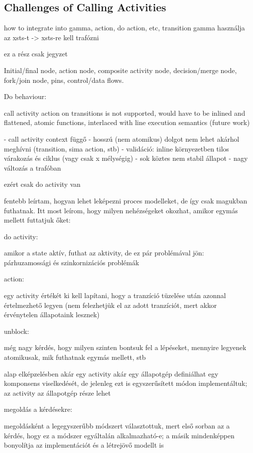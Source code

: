 \subsection{Challenges of Calling Activities}

how to integrate into gamma, action, do action, etc, transition
gamma használja az xsts-t -> xsts-re kell trafózni


ez a rész csak jegyzet

Initial/final node, action node, composite activity node, decision/merge node, fork/join node, pins, control/data flows.

Do behaviour: 

call activity action on transitions is not supported, would have to be inlined and flattened, atomic functions, interlaced with line execution semantics (future work)

- call activity context függő - hosszú (nem atomikus) dolgot nem lehet akárhol meghívni (transition, sima action, stb)
- validáció: inline környezetben tilos várakozás és ciklus (vagy csak x mélységig)
- sok köztes nem stabil állapot
- nagy változás a trafóban

ezért csak do activity van

fentebb leírtam, hogyan lehet leképezni proces modelleket, de így csak magukban futhatnak. Itt most leírom, hogy milyen nehézségeket okozhat, amikor egymás mellett futtatjuk őket:

do activity:

amikor a state aktív, futhat az aktivity, de ez pár problémával jön: párhuzamossági és szinkornizációs problémák

action:

egy activity értékét ki kell lapítani, hogy a tranzíció tüzelése után azonnal értelmezhető legyen (nem felezhetjük el az adott tranzíciót, mert akkor érvénytelen állapotaink lesznek)

unblock:

még nagy kérdés, hogy milyen szinten bontsuk fel a lépéseket, mennyire legyenek atomikusak, mik futhatnak egymás mellett, stb

alap elképzelésben akár egy activity akár egy állapotgép definiálhat egy komponsens viselkedését, de jelenleg ezt is egyszerűsített módon implementáltuk; az activity az állapotgép része lehet

megoldás a kérdésekre:

megoldásként a legegyszerűbb módszert választottuk, mert első sorban az a kérdés, hogy ez a módszer egyáltalán alkalmazható-e; a másik mindenképpen bonyolítja az implementációt és a létrejövő modellt is
